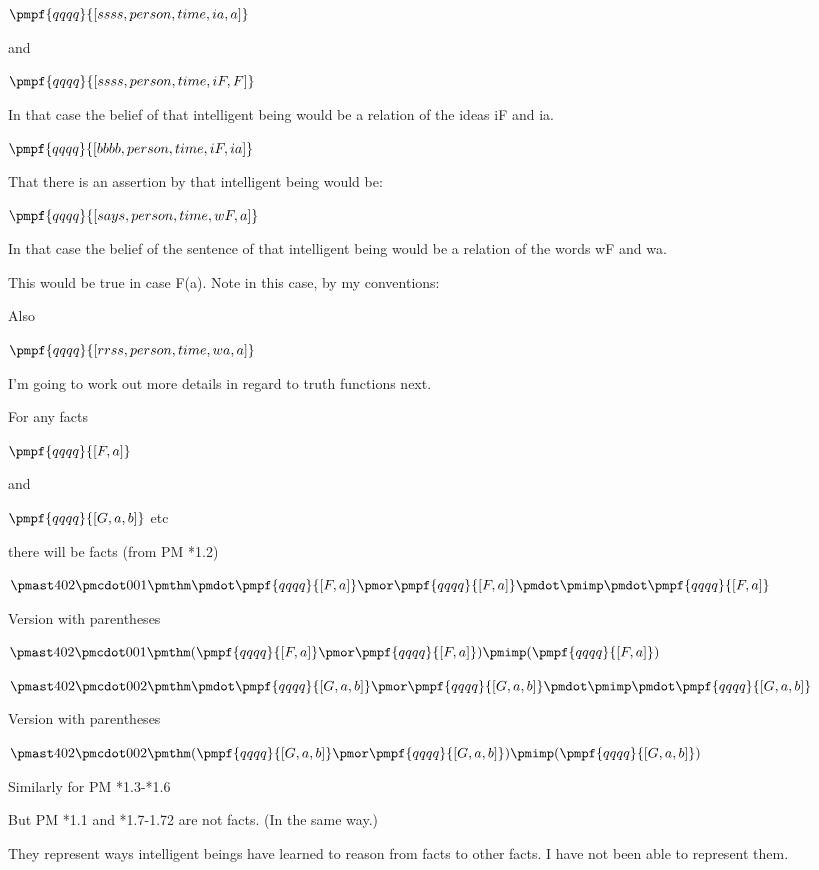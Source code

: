 \documentclass[12pt]{article}
\begin{document}
$\pmpf{qqqq}{[ssss, person, time, ia, a]}$

and

$\pmpf{qqqq}{[ssss, person, time, iF , F]} $

In that case the belief of that intelligent being would be a relation
of the ideas iF and ia.

$\pmpf{qqqq}{[bbbb, person, time, iF, ia]} $


That there is an assertion by that intelligent being would be:

$\pmpf{qqqq}{[says, person, time, wF, a]}$

In that case the belief of the sentence of that intelligent being would
be a relation of the words wF and wa.

This would be true in case F(a).
Note in this case, by my conventions:

Also

$\pmpf{qqqq}{[rrss, person, time, wa, a]}$

I'm going to work out more details in regard to truth functions next.

For any facts 

$\pmpf{qqqq}{[F,a]}$

and

$\pmpf{qqqq}{[G, a, b]}$
etc

there will be facts (from PM *1.2)

$\pmast 402 \pmcdot 001 \pmthm \pmdot \pmpf{qqqq}{[F,a]} \pmor \pmpf{qqqq}{[F,a]} \pmdot \pmimp \pmdot \pmpf{qqqq}{[F,a]}$
 
 

Version with parentheses

$\pmast 402 \pmcdot 001 \pmthm  (  \pmpf{qqqq}{[F,a]} \pmor \pmpf{qqqq}{[F,a]}  ) \pmimp (  \pmpf{qqqq}{[F,a]})$


$\pmast 402 \pmcdot 002 \pmthm \pmdot \pmpf{qqqq}{[G,a,b]} \pmor \pmpf{qqqq}{[G,a,b]} \pmdot \pmimp \pmdot \pmpf{qqqq}{[G,a,b]}$
 
 

Version with parentheses

$\pmast 402 \pmcdot 002 \pmthm  (  \pmpf{qqqq}{[G,a,b]} \pmor \pmpf{qqqq}{[G,a,b]}  ) \pmimp (  \pmpf{qqqq}{[G,a,b]}     )$


Similarly for PM *1.3-*1.6

But PM *1.1 and *1.7-1.72 are not facts. (In the same way.)

They represent ways intelligent beings have learned to
reason from facts to other facts. I have not been able to represent them.
\end{document}
